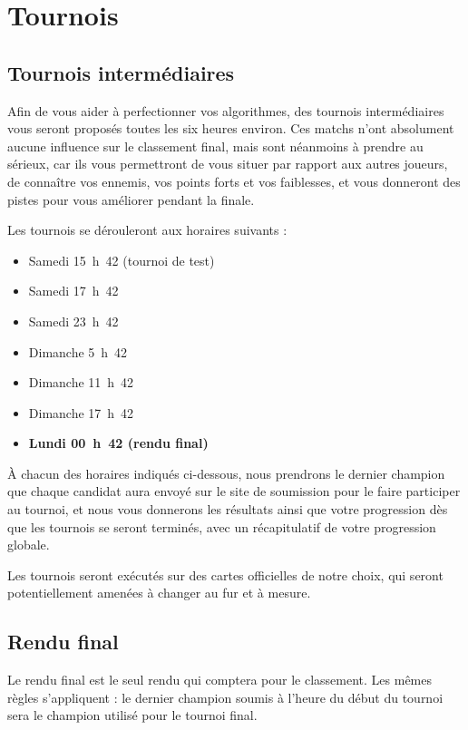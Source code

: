 \section{Tournois}

\subsection{Tournois intermédiaires}

Afin de vous aider à perfectionner vos algorithmes, des tournois intermédiaires
vous seront proposés toutes les six heures environ. Ces matchs n'ont absolument
aucune influence sur le classement final, mais sont néanmoins à prendre au
sérieux, car ils vous permettront de vous situer par rapport aux autres
joueurs, de connaître vos ennemis, vos points forts et vos faiblesses, et vous
donneront des pistes pour vous améliorer pendant la finale.

Les tournois se dérouleront aux horaires suivants :

\begin{itemize}
    \item Samedi 15~h~42 (tournoi de test)
    \item Samedi 17~h~42
    \item Samedi 23~h~42
    \item Dimanche 5~h~42
    \item Dimanche 11~h~42
    \item Dimanche 17~h~42
    \item \textbf{Lundi 00~h~42 (rendu final)}
\end{itemize}

À chacun des horaires indiqués ci-dessous, nous prendrons le dernier champion
que chaque candidat aura envoyé sur le site de soumission pour le faire
participer au tournoi, et nous vous donnerons les résultats ainsi que votre
progression dès que les tournois se seront terminés, avec un récapitulatif
de votre progression globale.

Les tournois seront exécutés sur des cartes officielles de notre choix, qui
seront potentiellement amenées à changer au fur et à mesure.

\subsection{Rendu final}

Le rendu final est le seul rendu qui comptera pour le classement. Les mêmes
règles s'appliquent : le dernier champion soumis à l'heure du début du tournoi
sera le champion utilisé pour le tournoi final.

